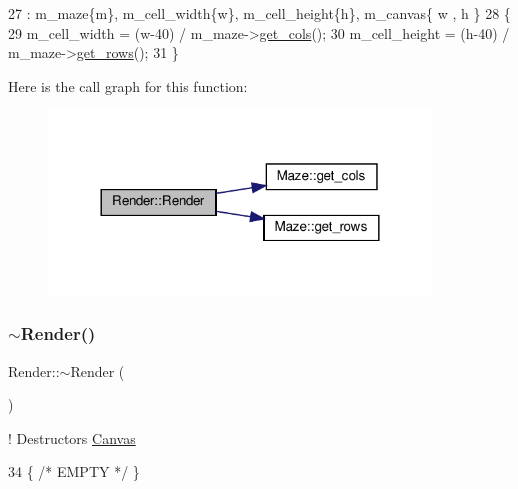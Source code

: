 \begin{DoxyCode}
27                                                 : m\_maze\{m\}, m\_cell\_width\{w\}, m\_cell\_height\{h\}, m\_canvas\{ w
       , h \}
28         \{
29             m\_cell\_width = (w-40) / m\_maze->\hyperlink{classMaze_a8a04cd1335e96a80358181afa164d4c9}{get\_cols}();
30             m\_cell\_height = (h-40) / m\_maze->\hyperlink{classMaze_ac786606a34632b2254b2d27d5f5f0f3f}{get\_rows}();
31         \}
\end{DoxyCode}
Here is the call graph for this function\+:\nopagebreak
\begin{figure}[H]
\begin{center}
\leavevmode
\includegraphics[width=288pt]{classRender_a6e41bd186a63bf1852209ef34ea3d357_cgraph}
\end{center}
\end{figure}
\mbox{\label{classRender_ab0f4b917605cb15902f8d045a4197faf}} 
\subsubsection{\texorpdfstring{$\sim$\+Render()}{~Render()}}
{\footnotesize\ttfamily Render\+::$\sim$\+Render (\begin{DoxyParamCaption}{ }\end{DoxyParamCaption})\hspace{0.3cm}{\ttfamily [inline]}}



! Destructors \hyperlink{classCanvas}{Canvas} 


\begin{DoxyCode}
34 \{ \textcolor{comment}{/* EMPTY */} \}
\end{DoxyCode}
\mbox{\label{classRender_a034f7ab9a411cf3d6d379c27d4fe8115}} 
